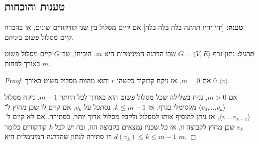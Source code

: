 \documentclass[]{article}
\newcommand\ra    {\rangle}
\newcommand\la    {\langle}
\begin{document}
	\subsection{טענות והוכחות}
	
	\textbf{טענה: }[יהי יהיו תהינה בלה בלה בלה] אם קיים מסלול בין שני קודקודים שונים, אז בהכרח קיים מסלול פשוט ביניהם. 
	
	\textbf{תרגיל: } נתון גרף $G = \la V, E \ra$ שבו הדרגה המינימלית היא $m$. הוכיחו, שב־$G$ קיים מסלול פשוט באורך לפחות $m$. 
	
	\begin{proof}
		אם $m = 0$, אז ניקח קדוקוד כלשהו $v$ והוא מהווה מסלול פשוט באורך $0$ $\la v \ra$. 
		
		אם $m > 0$, נניח בשלילה שכל מסלול פשוט הוא באורך לכל היותר $m - 1$. ניקח מסלול $\la v_0, \dots v_k \ra$ מקסימלי בגרף. אז $k \le m - 1$. נסתכל על $v_k$. אם קיים לו שכן מחוץ ל־$\la v_, \dots v_{k -1 } \ra$, אז ניתן להוסיף אותו למסלול ולקבל מסלול ארוך יותר, בסתירה. אם לא קיים ל־$v_k$ שכן מחוץ לקבוצה זו, אז כל שכניו נמצאים בקבוצה הזו, ובה יש לכל $k$ קודקודים כלומר $d(v_k) \le k \le m - 1$ וזו סתירה לנתון שהדרגה המינימלית היא $m$. 
	\end{proof}
	
	
\end{document}
